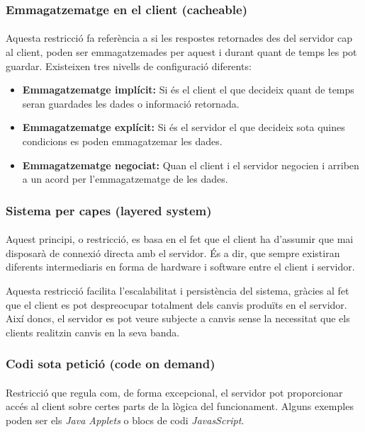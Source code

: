     \subsubsection{Emmagatzematge en el client (cacheable)}\label{section:42caching}

    \paragraph{}
    Aquesta restricció fa referència a si les respostes retornades des del servidor cap al client, poden ser emmagatzemades per aquest i durant quant de temps les pot guardar. Existeixen tres nivells de configuració diferents:

    \begin{itemize}
        \item \textbf{Emmagatzematge implícit:} Si és el client el que decideix quant de temps seran guardades les dades o informació retornada.
        \item \textbf{Emmagatzematge explícit:} Si és el servidor el que decideix sota quines condicions es poden emmagatzemar les dades.
        \item \textbf{Emmagatzematge negociat:} Quan el client i el servidor negocien i arriben a un acord per l'emmagatzematge de les dades.
    \end{itemize}


    \subsubsection{Sistema per capes (layered system)}

    \paragraph{}
    Aquest principi, o restricció, es basa en el fet que el client ha d'assumir que mai disposarà de connexió directa amb el servidor. És a dir, que sempre existiran diferents intermediaris en forma de hardware i software entre el client i servidor.

    Aquesta restricció facilita l’escalabilitat i persistència del sistema, gràcies al fet que el client es pot despreocupar totalment dels canvis produïts en el servidor. Així doncs, el servidor es pot veure subjecte a canvis sense la necessitat que els clients realitzin canvis en la seva banda.


    \subsubsection{Codi sota petició (code on demand)}

    \paragraph{}
    Restricció que regula com, de forma excepcional, el servidor pot proporcionar accés al client sobre certes parts de la lògica del funcionament. Alguns exemples poden ser els \emph{Java Applets} o blocs de codi \emph{JavasScript}.
